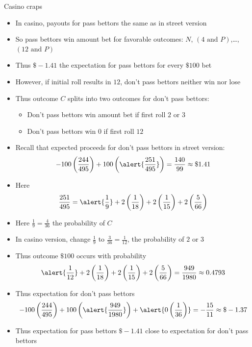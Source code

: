 \documentclass[handout]{beamer}
\theoremstyle{definition}
\begin{document}
\begin{frame}{Casino craps}
\begin{itemize}
\item In casino, payouts for pass bettors the same as in street version
\item So pass bettors win amount bet
for favorable outcomes: $N$,
$\left(\text{$4$ and $P$}\right)$,\dots,
$\left(\text{$12$ and $P$}\right)$
\item Thus $\$-1.41$ the expectation for pass bettors
for every $\$100$ bet
\item However, if initial roll results in $12$, don't pass bettors
neither win nor lose
\item Thus outcome $C$ splits into two outcomes for don't pass bettors:
\begin{itemize}
\item Don't pass bettors win amount bet if first roll $2$ or $3$
\item Don't pass bettors win $0$ if first roll $12$
\end{itemize}
\end{itemize}
\end{frame}

\begin{frame}
\begin{itemize}
\item Recall that expected proceeds for don't pass bettors
in \alert{street} version:
\[-100\left(\frac{244}{495}\right)+100\left(\alert{\frac{251}{495}}\right)
=\frac{140}{99}\approx \$1.41\]
\item Here
\[\frac{251}{495}
=\alert{\frac{1}{9}}+2\left(\frac{1}{18}\right)
+2\left(\frac{1}{15}\right)+2\left(\frac{5}{66}\right)\]
\item Here $\frac{1}{9}=\frac{4}{36}$ the probability of $C$
\item In \alert{casino} version, change $\frac{1}{9}$ to
$\frac{3}{36}=\frac{1}{12}$, the probability of $2$ or $3$
\end{itemize}
\end{frame}

\begin{frame}
\begin{itemize}
\item Thus outcome $\$100$ occurs with probability
\[\alert{\frac{1}{12}}+2\left(\frac{1}{18}\right)
+2\left(\frac{1}{15}\right)+2\left(\frac{5}{66}\right)
=\frac{949}{1980}\approx 0.4793\]
\item Thus expectation for don't pass bettors
\[-100\left(\frac{244}{495}\right)+100\left(\alert{\frac{949}{1980}}\right)
+\alert{0\left(\frac{1}{36}\right)}
=-\frac{15}{11}\approx \$-1.37\]
\item Thus expectation for pass bettors $\$-1.41$
close to expectation for don't pass bettors
\end{itemize}
\end{frame}
\end{document}
